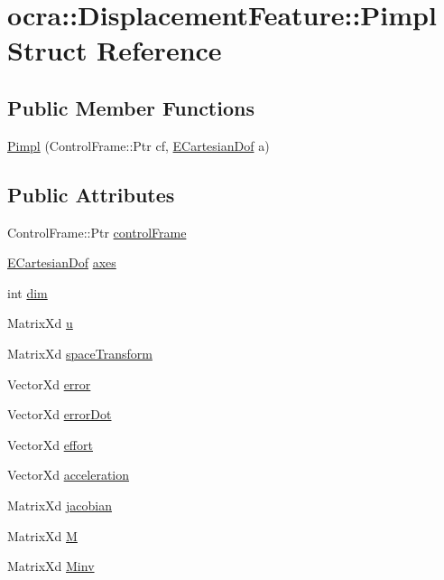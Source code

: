 \hypertarget{structocra_1_1DisplacementFeature_1_1Pimpl}{}\section{ocra\+:\+:Displacement\+Feature\+:\+:Pimpl Struct Reference}
\label{structocra_1_1DisplacementFeature_1_1Pimpl}
\subsection*{Public Member Functions}
\begin{DoxyCompactItemize}
\item 
\hyperlink{structocra_1_1DisplacementFeature_1_1Pimpl_a74a8e0493ff78e399aef5f07e4a092e3}{Pimpl} (Control\+Frame\+::\+Ptr cf, \hyperlink{namespaceocra_a436781c7059a0f76027df1c652126260}{E\+Cartesian\+Dof} a)
\end{DoxyCompactItemize}
\subsection*{Public Attributes}
\begin{DoxyCompactItemize}
\item 
Control\+Frame\+::\+Ptr \hyperlink{structocra_1_1DisplacementFeature_1_1Pimpl_a7bf1e93fdc7fe08d51a844161f565223}{control\+Frame}
\item 
\hyperlink{namespaceocra_a436781c7059a0f76027df1c652126260}{E\+Cartesian\+Dof} \hyperlink{structocra_1_1DisplacementFeature_1_1Pimpl_a8c3adba9fb891dac9c158ceb4fad62ea}{axes}
\item 
int \hyperlink{structocra_1_1DisplacementFeature_1_1Pimpl_a1d9edf50ee4d19d01b71ae2e871519b6}{dim}
\item 
Matrix\+Xd \hyperlink{structocra_1_1DisplacementFeature_1_1Pimpl_a7ee31c021de6d56a80cfe6bebac34af1}{u}
\item 
Matrix\+Xd \hyperlink{structocra_1_1DisplacementFeature_1_1Pimpl_ae4f3165c1ca46e3d14cb9fdeab2297a0}{space\+Transform}
\item 
Vector\+Xd \hyperlink{structocra_1_1DisplacementFeature_1_1Pimpl_a98721661ee9190e726390f6049ffdf1b}{error}
\item 
Vector\+Xd \hyperlink{structocra_1_1DisplacementFeature_1_1Pimpl_ad5d72a6e8baf66f182ff8ec61a74530a}{error\+Dot}
\item 
Vector\+Xd \hyperlink{structocra_1_1DisplacementFeature_1_1Pimpl_a9df9dfcb9f2d59c1f09bd676c3589e7b}{effort}
\item 
Vector\+Xd \hyperlink{structocra_1_1DisplacementFeature_1_1Pimpl_a1495e4c5c743c4c82a7948a9c6911e31}{acceleration}
\item 
Matrix\+Xd \hyperlink{structocra_1_1DisplacementFeature_1_1Pimpl_a1dd31262d5e3fcec9850a03324754a8f}{jacobian}
\item 
Matrix\+Xd \hyperlink{structocra_1_1DisplacementFeature_1_1Pimpl_ac656f6c1eb52377b1d313820f4a448d4}{M}
\item 
Matrix\+Xd \hyperlink{structocra_1_1DisplacementFeature_1_1Pimpl_a9fc763f2f433156e2df5a239a64e5514}{Minv}
\end{DoxyCompactItemize}


